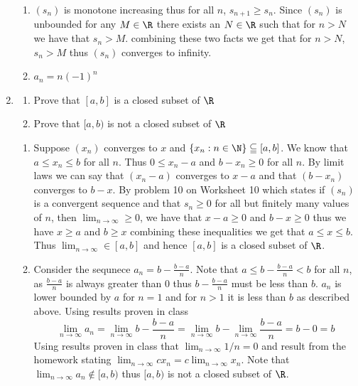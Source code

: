 \documentclass[11pt]{exam}
\begin{document}
\begin{enumerate}
\begin{solution}
\begin{enumerate}
                    \item $(s_n)$ is monotone increasing thus for all $n$, $s_{n+1} \geq s_n$. Since $(s_n)$ is unbounded for any $M \in \R$ there exists an $N \in \R$ such that for $n > N$ we have that $s_n > M$. combining these two facts we get that for $n > N$, $s_n > M$ thus $(s_n)$ converges to infinity.
                    \item $a_n = n(-1)^n$
                \end{enumerate}
            \end{solution}
        \item 
            \begin{enumerate}
                \item Prove that $[a, b]$ is a closed subset of $\R$
                \item Prove that $[a, b)$ is not a closed subset of $\R$
            \end{enumerate}
            \begin{solution}   
                \begin{enumerate}
                    \item Suppose $(x_n)$ converges to $x$ and $\{x_n : n \in \N \} \subseteqq [a, b]$. We know that $a \leq x_n \leq b$ for all $n$. Thus $0 \leq x_n - a$ and $b - x_n \geq 0$ for all $n$. By limit laws we can say that $(x_n - a)$ converges to $x - a$ and that $(b - x_n)$ converges to $b - x$. By problem 10 on Worksheet 10 which states if $(s_n)$ is a convergent sequence and that $s_n \geq 0$ for all but finitely many values of $n$, then $\lim_{n \to \infty} \geq 0$, we have that $x - a \geq 0$ and $b -x \geq 0$ thus we have $x \geq a$ and $b \geq x$ combining these inequalities we get that $a \leq x \leq b$. Thus $\lim_{n \to \infty} \in [a, b]$ and hence $[a, b]$ is a closed subset of $\R$. 
                    \item Consider the sequnece $a_n = b - \frac{b - a}{n}$. Note that $a \leq b - \frac{b - a}{n} < b$ for all $n$, as $\frac{b-a}{n}$ is always greater than 0 thus $b - \frac{b - a}{n}$ must be less than $b$. $a_n$ is lower bounded by $a$ for $n = 1$ and for $ n > 1$ it is less than $b$ as described above. Using results proven in class  $$\lim_{n \to \infty} a_n = \lim_{n \to \infty} b - \frac{b-a}{n} = \lim_{n \to \infty} b - \lim_{n \to \infty}  \frac{b-a}{n} = b - 0 = b$$
                    Using results proven in class that $\lim_{n \to \infty} 1/n = 0$ and result from the homework stating $\lim_{n \to \infty} cx_n = c \lim_{n \to \infty} x_n$. Note that $\lim_{n \to \infty} a_n \not\in [a, b)$ thus $[a, b)$ is not a closed subset of $\R$.

\end{enumerate}
\end{solution}
\end{enumerate}
\end{document}
